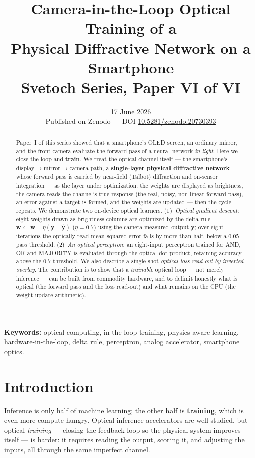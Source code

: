 \documentclass[11pt]{article}
\title{\textbf{Camera-in-the-Loop Optical Training of a\\ Physical Diffractive Network on a Smartphone}\\[4pt]
{\large Svetoch Series, Paper VI of VI}}
\author{\svetochauthor}
\date{17 June 2026\\[2pt]{\normalsize Published on Zenodo --- DOI \href{https://doi.org/10.5281/zenodo.20730393}{10.5281/zenodo.20730393}}}
\begin{document}
\maketitle

\begin{abstract}
\noindent Paper~I of this series showed that a smartphone's OLED screen, an ordinary mirror,
and the front camera evaluate the forward pass of a neural network \emph{in light}. Here we
close the loop and \textbf{train}. We treat the optical channel itself --- the smartphone's
display$\to$mirror$\to$camera path, a \textbf{single-layer physical diffractive network} whose
forward pass is carried by near-field (Talbot) diffraction and on-sensor integration --- as the
layer under optimization: the weights are displayed as brightness, the camera reads the channel's true
response (the real, noisy, non-linear forward pass), an error against a target is formed, and
the weights are updated --- then the cycle repeats. We demonstrate two on-device optical
learners. (1)~\emph{Optical gradient descent}: eight weights drawn as brightness columns are
optimized by the delta rule $\mathbf{w}\leftarrow\mathbf{w}-\eta(\mathbf{y}-\hat{\mathbf{y}})$
($\eta=0.7$) using the camera-measured output $\mathbf{y}$; over eight iterations the optically
read mean-squared error falls by more than half, below a $0.05$ pass threshold.
(2)~\emph{An optical perceptron}: an eight-input perceptron trained for AND, OR and MAJORITY is
evaluated through the optical dot product, retaining accuracy above the $0.7$ threshold. We also
describe a single-shot \emph{optical loss read-out by inverted overlay}. The contribution is to
show that a \emph{trainable} optical loop --- not merely inference --- can be built from
commodity hardware, and to delimit honestly what is optical (the forward pass and the loss
read-out) and what remains on the CPU (the weight-update arithmetic).
\end{abstract}

\noindent\textbf{Keywords:} optical computing, in-the-loop training, physics-aware learning,
hardware-in-the-loop, delta rule, perceptron, analog accelerator, smartphone optics.

\section{Introduction}
Inference is only half of machine learning; the other half is \textbf{training}, which is even
more compute-hungry. Optical inference accelerators are well studied, but optical \emph{training}
--- closing the feedback loop so the physical system improves itself --- is harder: it requires
reading the output, scoring it, and adjusting the inputs, all through the same imperfect channel.
\end{document}
